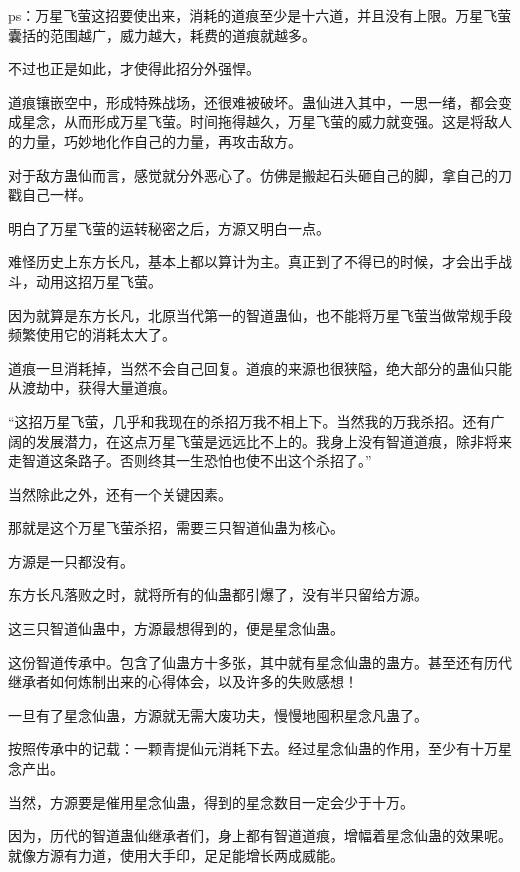 
\begin{this_body}

ps：万星飞萤这招要使出来，消耗的道痕至少是十六道，并且没有上限。万星飞萤囊括的范围越广，威力越大，耗费的道痕就越多。

不过也正是如此，才使得此招分外强悍。

道痕镶嵌空中，形成特殊战场，还很难被破坏。蛊仙进入其中，一思一绪，都会变成星念，从而形成万星飞萤。时间拖得越久，万星飞萤的威力就变强。这是将敌人的力量，巧妙地化作自己的力量，再攻击敌方。

对于敌方蛊仙而言，感觉就分外恶心了。仿佛是搬起石头砸自己的脚，拿自己的刀戳自己一样。

明白了万星飞萤的运转秘密之后，方源又明白一点。

难怪历史上东方长凡，基本上都以算计为主。真正到了不得已的时候，才会出手战斗，动用这招万星飞萤。

因为就算是东方长凡，北原当代第一的智道蛊仙，也不能将万星飞萤当做常规手段频繁使用它的消耗太大了。

道痕一旦消耗掉，当然不会自己回复。道痕的来源也很狭隘，绝大部分的蛊仙只能从渡劫中，获得大量道痕。

“这招万星飞萤，几乎和我现在的杀招万我不相上下。当然我的万我杀招。还有广阔的发展潜力，在这点万星飞萤是远远比不上的。我身上没有智道道痕，除非将来走智道这条路子。否则终其一生恐怕也使不出这个杀招了。”

当然除此之外，还有一个关键因素。

那就是这个万星飞萤杀招，需要三只智道仙蛊为核心。

方源是一只都没有。

东方长凡落败之时，就将所有的仙蛊都引爆了，没有半只留给方源。

这三只智道仙蛊中，方源最想得到的，便是星念仙蛊。

这份智道传承中。包含了仙蛊方十多张，其中就有星念仙蛊的蛊方。甚至还有历代继承者如何炼制出来的心得体会，以及许多的失败感想！

一旦有了星念仙蛊，方源就无需大废功夫，慢慢地囤积星念凡蛊了。

按照传承中的记载：一颗青提仙元消耗下去。经过星念仙蛊的作用，至少有十万星念产出。

当然，方源要是催用星念仙蛊，得到的星念数目一定会少于十万。

因为，历代的智道蛊仙继承者们，身上都有智道道痕，增幅着星念仙蛊的效果呢。就像方源有力道，使用大手印，足足能增长两成威能。


\end{this_body}
